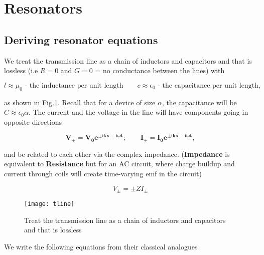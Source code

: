 
\newpage
\section{Resonators}\label{sec:transmission-line}

\subsection{Deriving resonator equations}
\label{sec:deriv-reson-equat}


We treat the transmission line as  a chain of inductors and capacitors
and that is lossless (i.e $ R=0 $ and $ G=0 $ = no conductance between
the lines) with

  \begin{equation}
    l \approx \mu_0 \text{ - the inductance per unit length}\qquad c \approx \epsilon_0 \text{ - the capacitance per unit length},
  \end{equation}

  \noindent  as  shown in  Fig.\ref{transtLine}.   Recall  that for  a
  device    of   size    $   \alpha    $,   the    capacitance   will    be
  $ C \approx  \epsilon_0\alpha $.  The current and the  voltage in the line
  will have components going in opposite directions

  \begin{equation}
    \label{tlineCurrentVoltage}
    \mathbf{V_{\pm} = V_0e^{\pm ikx-i\omega t};\qquad I_{\pm} = I_0e^{\pm ikx-i\omega t}},
  \end{equation}

  \noindent and  be related to  each other via the  complex impedance.
  (\textbf{Impedance} is equivalent to  \textbf{Resistance} but for an
  AC  circuit, where  charge buildup  and current  through coils  will
  create time-varying emf in the circuit)

 \begin{equation}
   V_{\pm}= \pm ZI_{\pm}
 \end{equation}

 \begin{figure}[h]
   \caption{Treat the  transmission line as  a chain of  inductors and
     capacitors and that is lossless \label{transtLine}}
   \texttt{[image: tline]}
 \end{figure}

 \noindent  We  write the  following  equations  from their  classical
 analogues

